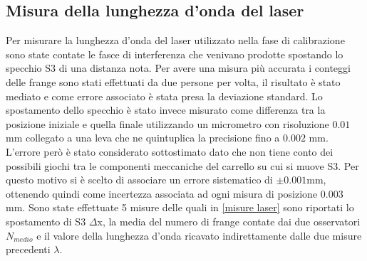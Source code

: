 \documentclass{article}
\begin{document}
\subsection{Misura della lunghezza d'onda del laser}
    Per misurare la lunghezza d'onda del laser utilizzato nella fase di calibrazione sono state contate le fasce di interferenza che venivano prodotte spostando lo specchio S3 di una distanza nota. Per avere una misura più accurata i conteggi delle frange sono stati effettuati da due persone per volta, il risultato è stato mediato e come errore associato è stata presa la deviazione standard. Lo spostamento dello specchio è stato invece misurato come differenza tra la posizione iniziale e quella finale utilizzando un micrometro con risoluzione $0.01$mm collegato a una leva che ne quintuplica la precisione fino a $0.002$ mm. L'errore però è stato considerato sottostimato dato che non tiene conto dei possibili giochi tra le componenti meccaniche del carrello su cui si muove S3. Per questo motivo si è scelto di associare un errore sistematico di $\pm 0.001$mm, ottenendo quindi come incertezza associata ad ogni misura di posizione $0.003$ mm. Sono state effettuate 5 misure delle quali in \ref{misure laser} sono riportati lo spostamento di S3 $\Delta$x, la media del numero di frange contate dai due osservatori  $N_{medio}$ e il valore della lunghezza d'onda ricavato indirettamente dalle due misure precedenti $\lambda$.
\end{document}
